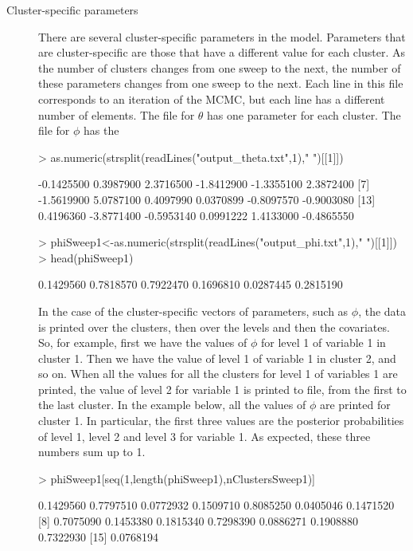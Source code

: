 \documentclass{article}
\begin{document}
\begin{description}
\item[Cluster-specific parameters] There are several cluster-specific parameters in the model. Parameters that are cluster-specific are those that have a different value for each cluster. As the number of clusters changes from one sweep to the next, the number of these parameters changes from one sweep to the next. Each line in this file corresponds to an iteration of the MCMC, but each line has a different number of elements. The file for $\theta$ has one parameter for each cluster. The file for $\phi$ has the 
\begin{Schunk}
\begin{Sinput}
> as.numeric(strsplit(readLines("output_theta.txt",1)," ")[[1]])
\end{Sinput}
\begin{Soutput}
 [1] -0.1425500  0.3987900  2.3716500 -1.8412900 -1.3355100  2.3872400
 [7] -1.5619900  5.0787100  0.4097990  0.0370899 -0.8097570 -0.9003080
[13]  0.4196360 -3.8771400 -0.5953140  0.0991222  1.4133000 -0.4865550
\end{Soutput}
\begin{Sinput}
> phiSweep1<-as.numeric(strsplit(readLines("output_phi.txt",1)," ")[[1]])
> head(phiSweep1)
\end{Sinput}
\begin{Soutput}
[1] 0.1429560 0.7818570 0.7922470 0.1696810 0.0287445 0.2815190
\end{Soutput}
\end{Schunk}

In the case of the cluster-specific vectors of parameters, such as $\phi$, the data is printed over the clusters, then over the levels and then the covariates. So, for example, first we have the values of $\phi$ for level 1 of variable 1 in cluster 1. Then we have the value of level 1 of variable 1 in cluster 2, and so on. When all the values for all the clusters for level 1 of variables 1 are printed, the value of level 2 for variable 1 is printed to file, from the first to the last cluster. In the example below, all the values of $\phi$ are printed for cluster 1. In particular, the first three values are the posterior probabilities of level 1, level 2 and level 3 for variable 1. As expected, these three numbers sum up to 1. 

\begin{Schunk}
\begin{Sinput}
> phiSweep1[seq(1,length(phiSweep1),nClustersSweep1)]
\end{Sinput}
\begin{Soutput}
 [1] 0.1429560 0.7797510 0.0772932 0.1509710 0.8085250 0.0405046 0.1471520
 [8] 0.7075090 0.1453380 0.1815340 0.7298390 0.0886271 0.1908880 0.7322930
[15] 0.0768194
\end{Soutput}
\end{Schunk}


\end{description}
\end{document}
